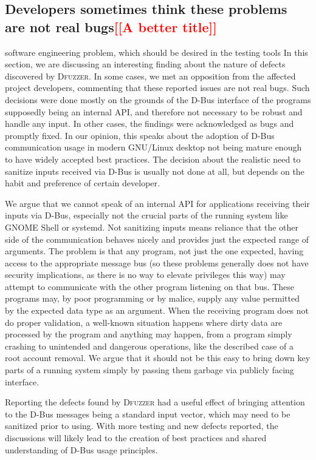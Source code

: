 \documentclass[conference]{IEEEtran}
\newcommand{\addtodo}[1]{\textcolor{red}{[[#1]]}}
\begin{document}
\subsection{Developers sometimes think these problems are not real bugs\addtodo{A better title}}
software engineering problem, which should be desired in the testing tools
In this section, we are discussing an interesting finding about the nature of
defects discovered by \textsc{Dfuzzer}. In some cases, we met an opposition
from the affected project developers, commenting that these reported issues are
not real bugs. Such decisions were done mostly on the grounds of the D-Bus
interface of the programs supposedly being an internal API, and therefore not
necessary to be robust and handle any input. In other cases, the findings were
acknowledged as bugs and promptly fixed. In our opinion, this speaks about the
adoption of D-Bus communication usage in modern GNU/Linux desktop not being
mature enough to have widely accepted best practices. The decision about the
realistic need to sanitize inputs received via D-Bus is usually not done at
all, but depends on the habit and preference of certain developer.


We argue that we cannot speak of an internal API for applications receiving
their inputs via D-Bus, especially not the crucial parts of the running system
like GNOME Shell or systemd. Not sanitizing inputs means reliance that the
other side of the communication behaves nicely and provides just the expected
range of arguments. The problem is that any program, not just the one expected,
having access to the appropriate message bus (so these problems generally does
not have security implications, as there is no way to elevate privileges this
way) may attempt to communicate with the other program listening on that bus.
These programs may, by poor programming or by malice, supply any value
permitted by the expected data type as an argument.  When the receiving program
does not do proper validation, a well-known situation happens where dirty data
are processed by the program and anything may happen, from a program simply
crashing to unintended and dangerous operations, like the described case of a
root account removal. We argue that it should not be this easy to bring down
key parts of a running system simply by passing them garbage via publicly
facing interface.


Reporting the defects found by \textsc{Dfuzzer} had a useful effect of bringing
attention to the D-Bus messages being a standard input vector, which may need to
be sanitized prior to using. With more testing and new defects reported, the
discussions will likely lead to the creation of best practices and shared
understanding of D-Bus usage principles.
\end{document}
